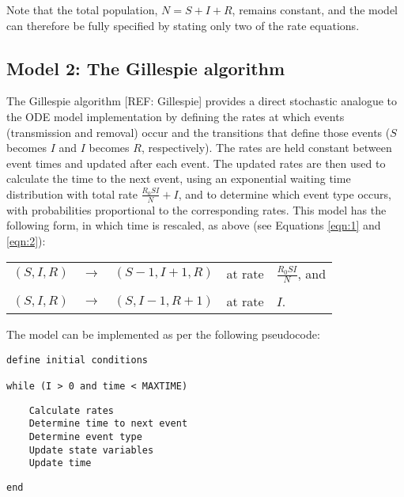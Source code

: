 \documentclass[margin,line,11pt]{article}
\begin{document}
\noindent Note that the total population, $N = S + I + R$, remains constant, and the model can therefore be fully specified by stating only two of the rate equations. %


\subsection{Model 2: The Gillespie algorithm}

The Gillespie algorithm [REF: Gillespie] provides a direct stochastic analogue to the ODE model implementation by defining the rates at which events (transmission and removal) occur and the transitions that define those events ($S$ becomes $I$ and $I$ becomes $R$, respectively). 
The rates are held constant between event times and updated after each event. 
The updated rates are then used to calculate the time to the next event, using an exponential waiting time distribution with total rate $\frac{R_0 S I}{N} + I$, and to determine which event type occurs, with probabilities proportional to the corresponding rates. 
This model has the following form, in which time is rescaled, as above (see Equations \ref{eqn:1} and \ref{eqn:2}):

\begin{table}[htb]
\begin{center}
\begin{tabular}[tb]{ccccl}
$(S,I,R)$ & $\rightarrow$ & $(S-1,I+1,R)$ & at rate & $\frac{R_0 S I}{N}$, and\\ 
&&&&\\
$(S,I,R)$ & $\rightarrow$ & $(S,I-1,R+1)$ & at rate & $I$.
\end{tabular}
\end{center}
\end{table}

\noindent The model can be implemented as per the following pseudocode:\\

\hfill\begin{minipage}{\dimexpr\textwidth-5cm}
\begin{verbatim}
define initial conditions

while (I > 0 and time < MAXTIME)
\end{verbatim}
\hfill\begin{minipage}{\dimexpr\textwidth-1cm}
\begin{verbatim}
	Calculate rates
	Determine time to next event 
	Determine event type
	Update state variables 
	Update time
\end{verbatim}
\end{minipage}
\begin{verbatim}
end
\end{verbatim}
\xdef\tpd{\the\prevdepth}
\end{minipage}
\end{document}
